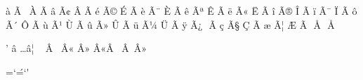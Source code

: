 
\mubyte ^^e0 ^^c3^^a0\endmubyte %
\mubyte ^^c0 ^^c3^^80\endmubyte %
\mubyte ^^e2 ^^c3^^a2\endmubyte %
\mubyte ^^c2 ^^c3^^82\endmubyte %
\mubyte ^^e9 ^^c3^^a9\endmubyte %
\mubyte ^^c9 ^^c3^^89\endmubyte %
\mubyte ^^e8 ^^c3^^a8\endmubyte %
\mubyte ^^c8 ^^c3^^88\endmubyte %
\mubyte ^^ea ^^c3^^aa\endmubyte %
\mubyte ^^ca ^^c3^^8a\endmubyte %
\mubyte ^^eb ^^c3^^ab\endmubyte %
\mubyte ^^cb ^^c3^^8b\endmubyte %
\mubyte ^^ee ^^c3^^ae\endmubyte %
\mubyte ^^ce ^^c3^^8e\endmubyte %
\mubyte ^^ef ^^c3^^af\endmubyte %
\mubyte ^^cf ^^c3^^8f\endmubyte %
\mubyte ^^f4 ^^c3^^b4\endmubyte %
\mubyte ^^d4 ^^c3^^94\endmubyte %
\mubyte ^^f9 ^^c3^^b9\endmubyte %
\mubyte ^^d9 ^^c3^^99\endmubyte %
\mubyte ^^fb ^^c3^^bb\endmubyte %
\mubyte ^^db ^^c3^^9b\endmubyte %
\mubyte ^^fc ^^c3^^bc\endmubyte %
\mubyte ^^dc ^^c3^^9c\endmubyte %
\mubyte ^^ff ^^c3^^bf\endmubyte %
\mubyte ^^9f ^^c3^^9f\endmubyte %
\mubyte ^^e7 ^^c3^^a7\endmubyte %
\mubyte ^^c7 ^^c3^^87\endmubyte %
\mubyte ^^e6 ^^c3^^a6\endmubyte %
\mubyte ^^c6 ^^c3^^86\endmubyte %
\mubyte ^^9c ^^c5^^93\endmubyte %
\mubyte ^^8c ^^c5^^92\endmubyte %

\mubyte '     ^^e2^^80^^99\endmubyte     %
\mubyte \dots ^^e2^^80^^a6\endmubyte     %
\mubyte ~     ^^c2^^a0\endmubyte         %
\mubyte \og   ^^c2^^ab\endmubyte         %
\mubyte \fg   ^^c2^^bb\endmubyte         %
\mubyte \og   ^^c2^^ab^^c2^^a0\endmubyte %
\mubyte \fg   ^^c2^^a0^^c2^^bb\endmubyte %



\def\english{\language=\z@
  \lefthyphenmin=2 \righthyphenmin=3 \lccode`\'=\z@}

\newlanguage\lang@french
\begingroup
  \language=\lang@french \lccode`\'=`\'
  
\endgroup
\def\french{\language=\lang@french
  \lefthyphenmin=2 \righthyphenmin=2 \lccode`\'=`\'}

\newlanguage\lang@nohyphen
\def\nohyphen{\language=\lang@nohyphen}


